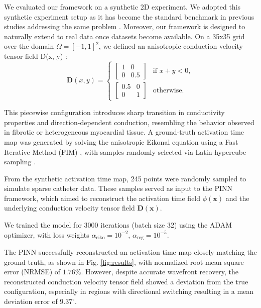 We evaluated our framework on a synthetic 2D experiment. We adopted this synthetic experiment setup as it has become the standard benchmark in previous studies addressing the same problem \cite{Mase2010, coveney2020, Karoui2021, SahliCostabal2020}. Moreover, our framework is designed to naturally extend to real data once datasets become available. On a 35x35 grid over the domain $\Omega = [-1,1]^2$, we defined an anisotropic conduction velocity tensor field D(x, y) \cite{RuizHerrera2022}:
\begin{equation}
\mathbf{D}(x, y) =
\begin{cases}
\begin{bmatrix} 1 & 0 \\ 0 & 0.5 \end{bmatrix} & \text{if } x + y < 0, \\
\begin{bmatrix} 0.5 & 0 \\ 0 & 1 \end{bmatrix} & \text{otherwise.}
\end{cases}
\end{equation}

This piecewise configuration introduces sharp transition in conductivity properties and direction-dependent conduction, resembling the behavior observed in fibrotic or heterogeneous myocardial tissue. A ground-truth activation time map was generated by solving the anisotropic Eikonal equation using a Fast Iterative Method (FIM) \cite{Grandits2021}, with samples randomly selected via Latin hypercube sampling \cite{Stein1987}.

From the synthetic activation time map, 245 points were randomly sampled to simulate sparse catheter data. These samples served as input to the PINN framework, which aimed to reconstruct the activation time field $\phi(\mathbf{x})$ and the underlying conduction velocity tensor field $\mathbf{D}(\mathbf{x})$.

We trained the model for 3000 iterations (batch size 32) using the ADAM optimizer, with loss weights $\alpha_{\text{eiko}} = 10^{-2}$, $\alpha_{\text{reg}} = 10^{-5}$.

The PINN successfully reconstructed an activation time map closely matching the ground truth, as shown in Fig. \ref{fig:results}, with normalized root mean square error (NRMSE) of $1.76\%$. However, despite accurate wavefront recovery, the reconstructed conduction velocity tensor field showed a deviation from the true configuration, especially in regions with directional switching resulting in a mean deviation error of $9.37^\circ$.

